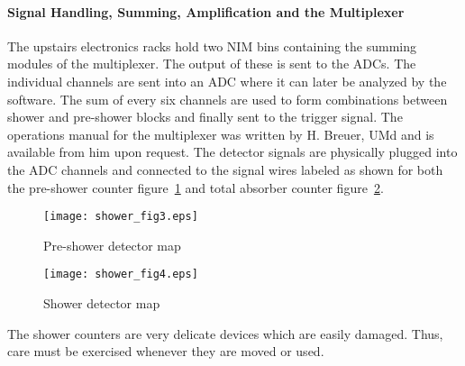 \documentclass[12pt]{article}
\begin{document}
\paragraph{Signal Handling, Summing, Amplification and the Multiplexer}
The upstairs electronics racks hold two NIM bins containing the
summing modules of the multiplexer.  The output of these is sent to
the ADCs.  The individual channels are sent into an ADC where it can
later be analyzed by the software.  The sum of every six channels are
used to form combinations between shower and pre-shower blocks and
finally sent to the trigger signal.  The operations manual for the
multiplexer was written by H. Breuer, UMd and is available from him
upon request.  The detector signals are physically plugged into the
ADC channels and connected to the signal wires labeled as shown for
both the pre-shower counter figure~\ref{map_psh} and total absorber
counter figure~\ref{map_sh}.
\begin{figure}
\begin{center}
\texttt{[image: shower\_fig3.eps]}
{\linespread{1.}
\caption[Wiring map for pre-shower ]{Pre-shower detector map}
\label{map_psh}}
\end{center}
\end{figure}
%
\begin{figure}
\begin{center}
\texttt{[image: shower\_fig4.eps]}
{\linespread{1.}
\caption[Wiring map for shower ]{Shower detector map}
\label{map_sh}}
\end{center}
\end{figure}
%
The shower counters are very delicate devices which are easily
damaged.  Thus, care must be exercised whenever they are moved or
used.
\end{document}
